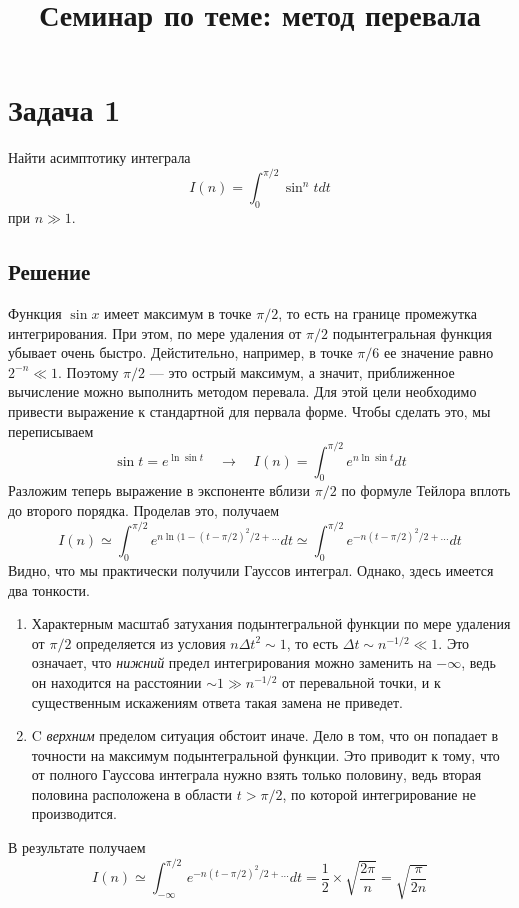 \documentclass[a4paper,12pt]{article}
\begin{document}
\title{Семинар по теме: метод перевала}

\maketitle
\section{Задача 1}

Найти асимптотику интеграла 
\[
I(n)=\int_{0}^{\pi/2}\sin^n t dt
\]
при $n\gg 1$.


\subsection{Решение}
Функция $\sin x$ имеет максимум в точке $\pi/2$, то есть на границе промежутка интегрирования. При этом, по мере удаления от $\pi /2$ подынтегральная функция убывает очень быстро. Дейстительно, например, в точке $\pi/6$ ее значение равно $2^{-n}\ll 1$. Поэтому $\pi/2$ --- это острый максимум, а значит, приближенное вычисление можно выполнить методом перевала. Для этой цели необходимо привести выражение к стандартной для первала форме. Чтобы сделать это, мы переписываем
\[
\sin t = e^{\ln \sin t}\quad \rightarrow \quad I(n)=\int_0^{\pi/2}e^{n\ln \sin t}dt 
\]
\noindent
Разложим теперь выражение в экспоненте вблизи $\pi/2$ по формуле Тейлора вплоть до второго порядка. Проделав это, получаем
\[
I(n)\simeq \int_0^{\pi/2}e^{n\ln (1-(t-\pi/2)^2/2+...}dt \simeq \int_0^{\pi/2}e^{-n(t-\pi/2)^2/2+...}dt
\]
\noindent
Видно, что мы практически получили Гауссов интеграл. Однако, здесь имеется два тонкости.
\begin{enumerate}
\item Характерным масштаб затухания подынтегральной функции по мере удаления от $\pi/2$ определяется из условия $n\Delta t^2\sim 1$,  то есть $\Delta t \sim n^{-1/2}\ll 1$. Это означает, что \textit{нижний} предел интегрирования можно заменить на $-\infty$, ведь он находится на расстоянии $\sim 1 \gg n^{-1/2}$ от перевальной точки, и к существенным искажениям ответа такая замена не приведет.
\item C \textit{верхним} пределом ситуация обстоит иначе. Дело в том, что он попадает в точности на максимум подынтегральной функции. Это  приводит к тому, что от полного Гауссова интеграла нужно взять только половину, ведь вторая половина расположена в области $t>\pi/2$, по которой интегрирование не производится.
\end{enumerate}
\noindent
В результате получаем
\[
I(n)\simeq \int_{-\infty}^{\pi/2}e^{-n(t-\pi/2)^2/2+...}dt=\frac{1}{2}\times \sqrt{\frac{2\pi}{n}} = \sqrt{\frac{\pi}{2n}}
\]
\end{document}
